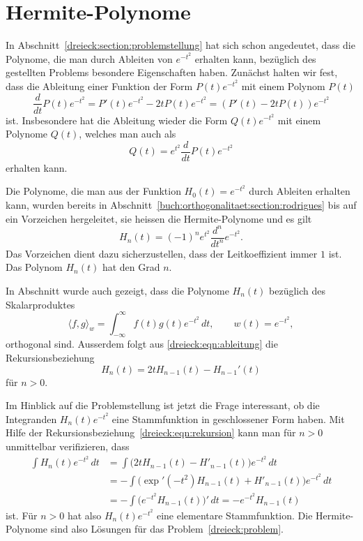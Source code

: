 %
%
%
\section{Hermite-Polynome
\label{dreieck:section:hermite-polynome}}
In Abschnitt~\ref{dreieck:section:problemstellung} hat sich schon angedeutet,
dass die Polynome, die man durch Ableiten von $e^{-t^2}$ erhalten
kann, bezüglich des gestellten Problems besondere Eigenschaften
haben.
Zunächst halten wir fest, dass die Ableitung einer Funktion der Form
$P(t)e^{-t^2}$ mit einem Polynom $P(t)$ 
\begin{equation}
\frac{d}{dt} P(t)e^{-t^2}
=
P'(t)e^{-t^2} -2tP(t)e^{-t^2}
=
(P'(t)-2tP(t)) e^{-t^2}
\label{dreieck:eqn:ableitung}
\end{equation}
ist.
Insbesondere hat die Ableitung wieder die Form $Q(t)e^{-t^2}$
mit einem Polynome $Q(t)$, welches man auch als
\[
Q(t)
=
e^{t^2}\frac{d}{dt}P(t)e^{-t^2}
\]
erhalten kann.

Die Polynome, die man aus der Funktion $H_0(t)=e^{-t^2}$ durch
Ableiten erhalten kann, wurden bereits in
Abschnitt~\ref{buch:orthogonalitaet:section:rodrigues}
bis auf ein Vorzeichen hergeleitet, sie heissen die Hermite-Polynome 
und es gilt
\[
H_n(t) 
=
(-1)^n
e^{t^2} \frac{d^n}{dt^n} e^{-t^2}.
\]
Das Vorzeichen dient dazu sicherzustellen, dass der Leitkoeffizient
immer $1$ ist.
Das Polynom $H_n(t)$ hat den Grad $n$.

In Abschnitt wurde auch gezeigt, dass die Polynome $H_n(t)$
bezüglich des Skalarproduktes
\[
\langle f,g\rangle_{w}
=
\int_{-\infty}^\infty f(t)g(t)e^{-t^2}\,dt,
\qquad
w(t)=e^{-t^2},
\]
orthogonal sind.
Ausserdem folgt aus \eqref{dreieck:eqn:ableitung}
die Rekursionsbeziehung
\begin{equation}
H_{n}(t)
=
2tH_{n-1}(t)
-
H_{n-1}'(t)
\label{dreieck:eqn:rekursion}
\end{equation}
für $n>0$.

Im Hinblick auf die Problemstellung ist jetzt die Frage interessant,
ob die Integranden $H_n(t)e^{-t^2}$ eine Stammfunktion in geschlossener
Form haben.
Mit Hilfe der Rekursionsbeziehung~\eqref{dreieck:eqn:rekursion}
kann man für $n>0$ unmittelbar verifizieren, dass
\begin{align*}
\int H_n(t)e^{-t^2}\,dt
&=
\int \bigl( 2tH_{n-1}(t) - H'_{n-1}(t)\bigr)e^{-t^2}\,dt
\\
&=
-\int \bigl( \exp'(-t^2) H_{n-1}(t) + H'_{n-1}(t)\bigr)e^{-t^2}\,dt
\\
&=
-\int \bigl( e^{-t^2}H_{n-1}(t)\bigr)' \,dt
=
-e^{-t^2}H_{n-1}(t)
\end{align*}
ist.
Für $n>0$ hat also $H_n(t)e^{-t^2}$ eine elementare Stammfunktion.
Die Hermite-Polynome sind also Lösungen für das
Problem~\ref{dreieck:problem}.


